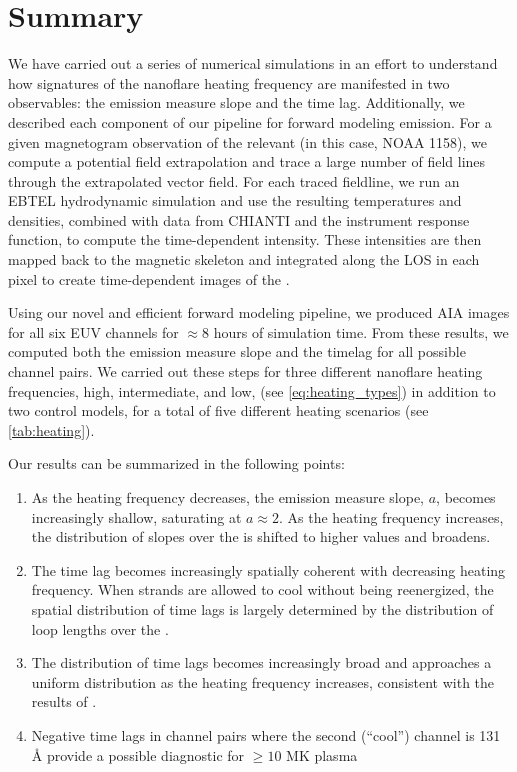 
\section{Summary}\label{conclusions}

We have carried out a series of numerical simulations in an effort to understand how signatures of the nanoflare heating frequency are manifested in two observables: the emission measure slope and the time lag. Additionally, we described each component of our pipeline for forward modeling \AR{} emission. For a given magnetogram observation of the relevant \AR{} (in this case, NOAA 1158), we compute a potential field extrapolation and trace a large number of field lines through the extrapolated vector field. For each traced fieldline, we run an EBTEL hydrodynamic simulation and use the resulting temperatures and densities, combined with data from CHIANTI and the instrument response function, to compute the time-dependent intensity. These intensities are then mapped back to the magnetic skeleton and integrated along the LOS in each pixel to create time-dependent images of the \AR{}.

Using our novel and efficient forward modeling pipeline, we produced AIA images for all six EUV channels for $\approx8$ hours of simulation time. From these results, we computed both the emission measure slope and the timelag for all possible channel pairs. We carried out these steps for three different nanoflare heating frequencies, high, intermediate, and low, (see \autoref{eq:heating_types}) in addition to two control models, for a total of five different heating scenarios (see \autoref{tab:heating}).

Our results can be summarized in the following points:
\begin{enumerate}
    \item As the heating frequency decreases, the emission measure slope, $a$, becomes increasingly shallow, saturating at $a\approx2$. As the heating frequency increases, the distribution of slopes over the \AR{} is shifted to higher values and broadens.
    \item The time lag becomes increasingly spatially coherent with decreasing heating frequency. When strands are allowed to cool without being reenergized, the spatial distribution of time lags is largely determined by the distribution of loop lengths over the \AR{}.
    \item The distribution of time lags becomes increasingly broad and approaches a uniform distribution as the heating frequency increases, consistent with the results of \citet{viall_signatures_2016}.
    \item Negative time lags in channel pairs where the second (``cool'') channel is 131 \AA{} provide a possible diagnostic for $\ge10$ MK plasma
\end{enumerate}

